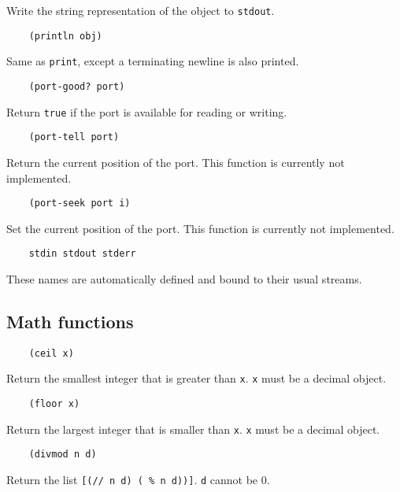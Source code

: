 \documentclass{article}
\newcommand{\inlinecode}{\texttt}
\begin{document}
Write the string representation of the object to \inlinecode{stdout}.

\begin{verbatim}
    (println obj)
\end{verbatim}

Same as \inlinecode{print}, except a terminating newline is also printed.

\begin{verbatim}
    (port-good? port)
\end{verbatim}

Return \inlinecode{true} if the port is available for reading or writing.

\begin{verbatim}
    (port-tell port)
\end{verbatim}

Return the current position of the port. This function is currently not implemented.

\begin{verbatim}
    (port-seek port i)
\end{verbatim}

Set the current position of the port. This function is currently not implemented.

\begin{verbatim}
    stdin stdout stderr
\end{verbatim}

These names are automatically defined and bound to their usual streams.

\subsection{Math functions}
\begin{verbatim}
    (ceil x)
\end{verbatim}

Return the smallest integer that is greater than \inlinecode{x}. \inlinecode{x} must be a decimal object.

\begin{verbatim}
    (floor x)
\end{verbatim}

Return the largest integer that is smaller than \inlinecode{x}. \inlinecode{x} must be a decimal object.

\begin{verbatim}
    (divmod n d)
\end{verbatim}

Return the list \inlinecode{[(// n d)  ( \% n d))]}. \inlinecode{d} cannot be 0.
\end{document}

